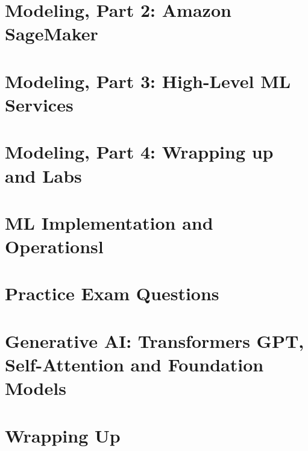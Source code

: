 \documentclass[11pt]{book}
\begin{document}
    \chapter{Modeling, Part 2: Amazon SageMaker}


    \chapter{Modeling, Part 3: High-Level ML Services}


    \chapter{Modeling, Part 4: Wrapping up and Labs}


    \chapter{ML Implementation and Operationsl}


    \chapter{Practice Exam Questions}


    \chapter{Generative AI: Transformers GPT, Self-Attention and Foundation Models}


    \chapter{Wrapping Up}
\end{document}
